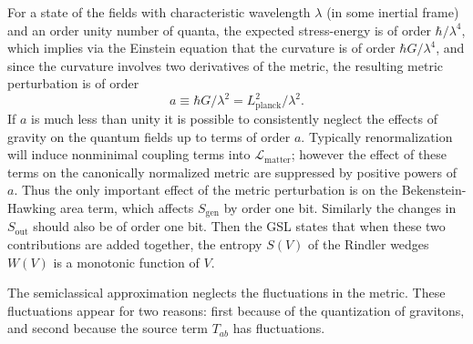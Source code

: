 \documentclass{article}
\begin{document}
For a state of the fields with characteristic wavelength $\lambda$ (in some inertial frame) and an order unity number of quanta, the expected stress-energy is of order $\hbar / \lambda^4$, which implies via the Einstein equation that the curvature is of order $\hbar G / \lambda^4$, and since the curvature involves two derivatives of the metric, the resulting metric perturbation is of order
\begin{equation}
a \equiv \hbar G / \lambda^2 = L_\mathrm{planck}^2 / \lambda^2.
\end{equation}
If $a$ is much less than unity it is possible to consistently neglect the effects of gravity on the quantum fields up to terms of order $a$.  Typically renormalization will induce nonminimal coupling terms into $\mathcal{L}_\mathrm{matter}$; however the effect of these terms on the canonically normalized metric are suppressed by positive powers of $a$.  Thus the only important effect of the metric perturbation is on the Bekenstein-Hawking area term, which affects $S_\mathrm{gen}$ by order one bit.  Similarly the changes in $S_\mathrm{out}$ should also be of order one bit.  Then the GSL states that when these two contributions are added together, the entropy $S(V)$ of the Rindler wedges $W(V)$ is a monotonic function of $V$.

The semiclassical approximation neglects the fluctuations in the metric.  These fluctuations appear for two reasons: first because of the quantization of gravitons, and second because the source term $T_{ab}$ has fluctuations.
\end{document}
